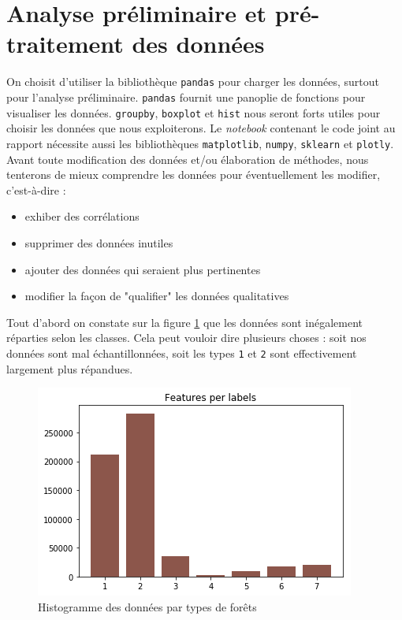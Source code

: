 \documentclass[12pt,a4paper]{article}
\numberwithin{equation}{section}
\begin{document}
	\newpage

	\tableofcontents
	
	\newpage
	
	\section{Analyse préliminaire et pré-traitement des données}
	
	On choisit d'utiliser la bibliothèque \verb!pandas! pour charger les données, surtout pour l'analyse préliminaire. \verb!pandas! fournit une panoplie de fonctions pour visualiser les données. \verb!groupby!, \verb!boxplot! et \verb!hist! nous seront forts utiles pour choisir les données que nous exploiterons. Le \textit{notebook} contenant le code joint au rapport nécessite aussi les bibliothèques \verb!matplotlib!, \verb!numpy!, \verb!sklearn! et \verb!plotly!.\\
	
	Avant toute modification des données et/ou élaboration de méthodes, nous tenterons de mieux comprendre les données pour éventuellement les modifier, c'est-à-dire :\\
	
	\begin{itemize}
		\item exhiber des corrélations
		\item supprimer des données inutiles
		\item ajouter des données qui seraient plus pertinentes
		\item modifier la façon de "qualifier" les données qualitatives
	\end{itemize}

	\medskip
	
	Tout d'abord on constate sur la figure \ref{fig:datahist} que les données sont inégalement réparties selon les classes. Cela peut vouloir dire plusieurs choses : soit nos données sont mal échantillonnées, soit les types \verb!1! et \verb!2! sont effectivement largement plus répandues.\\
	
	\begin{figure}
		\centering
		\includegraphics[width=.7\linewidth]{img/data_hist}
		\caption{Histogramme des données par types de forêts}
		\label{fig:datahist}
	\end{figure}
	
\end{document}
